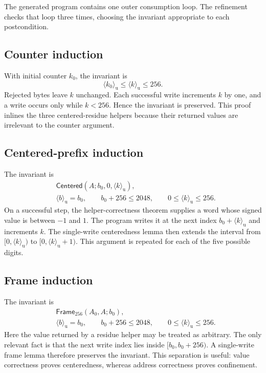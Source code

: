 \documentclass[11pt]{article}
\theoremstyle{definition}
\theoremstyle{plain}
\theoremstyle{remark}
\newcommand{\uint}[1]{\langle #1\rangle_{\mathrm u}}
\newcommand{\Frame}{\mathsf{Frame}_{256}}
\newcommand{\Centered}{\mathsf{Centered}}
\begin{document}
The generated program contains one outer consumption loop.  The refinement
checks that loop three times, choosing the invariant appropriate to each
postcondition.

\subsection{Counter induction}

With initial counter $k_0$, the invariant is
\[
  \uint{k_0}\le\uint{k}\le256.
\]
Rejected bytes leave $k$ unchanged.  Each successful write increments $k$ by
one, and a write occurs only while $k<256$.  Hence the invariant is preserved.
This proof inlines the three centered-residue helpers because their returned
values are irrelevant to the counter argument.

\subsection{Centered-prefix induction}

The invariant is
\[
\begin{aligned}
 &\Centered(A;b_0,0,\uint{k}),\\
 &\uint{b}=b_0,\qquad b_0+256\le2048,\qquad
 0\le\uint{k}\le256.
\end{aligned}
\]
On a successful step, the helper-correctness theorem supplies a word whose
signed value is between $-1$ and $1$.  The program writes it at the next index
$b_0+\uint{k}$ and increments $k$.  The single-write centeredness lemma then
extends the interval from $[0,\uint{k})$ to $[0,\uint{k}+1)$.  This argument is
repeated for each of the five possible digits.

\subsection{Frame induction}

The invariant is
\[
\begin{aligned}
 &\Frame(A_0,A;b_0),\\
 &\uint{b}=b_0,\qquad b_0+256\le2048,\qquad
 0\le\uint{k}\le256.
\end{aligned}
\]
Here the value returned by a residue helper may be treated as arbitrary.  The
only relevant fact is that the next write index lies inside
$[b_0,b_0+256)$.  A single-write frame lemma therefore preserves the
invariant.  This separation is useful: value correctness proves centeredness,
whereas address correctness proves confinement.
\end{document}
